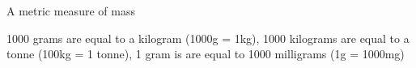 A metric measure of mass
\par
1000 grams are equal to a kilogram (1000g = 1kg),   
1000 kilograms are equal to a tonne (100kg = 1 tonne),
1 gram is  are equal to 1000 milligrams (1g = 1000mg)
